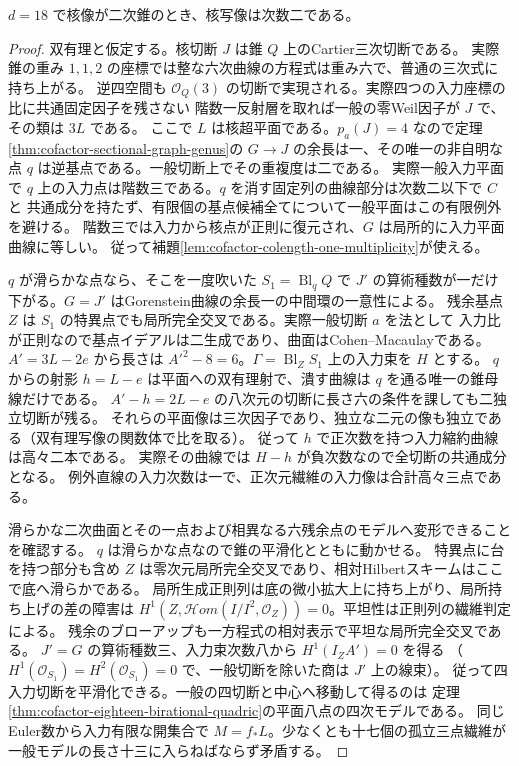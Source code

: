 \begin{theorem}\label{thm:cofactor-eighteen-cone-not-birational}
$d=18$ で核像が二次錐のとき、核写像は次数二である。
\end{theorem}
\begin{proof}
双有理と仮定する。核切断 $J$ は錐 $Q$ 上のCartier三次切断である。
実際錐の重み $1,1,2$ の座標では整な六次曲線の方程式は重み六で、普通の三次式に持ち上がる。
逆四空間も $\mathcal O_Q(3)$ の切断で実現される。実際四つの入力座標の比に共通固定因子を残さない
階数一反射層を取れば一般の零Weil因子が $J$ で、その類は $3L$ である。
ここで $L$ は核超平面である。$p_a(J)=4$ なので定理\ref{thm:cofactor-sectional-graph-genus}の
$G\to J$ の余長は一、その唯一の非自明な点 $q$ は逆基点である。一般切断上でその重複度は二である。
実際一般入力平面で $q$ 上の入力点は階数三である。$q$ を消す固定列の曲線部分は次数二以下で $C$ と
共通成分を持たず、有限個の基点候補全てについて一般平面はこの有限例外を避ける。
階数三では入力から核点が正則に復元され、$G$ は局所的に入力平面曲線に等しい。
従って補題\ref{lem:cofactor-colength-one-multiplicity}が使える。

$q$ が滑らかな点なら、そこを一度吹いた $S_1=\operatorname{Bl}_q Q$ で
$J'$ の算術種数が一だけ下がる。$G=J'$ はGorenstein曲線の余長一の中間環の一意性による。
残余基点 $Z$ は $S_1$ の特異点でも局所完全交叉である。実際一般切断 $a$ を法として
入力比が正則なので基点イデアルは二生成であり、曲面はCohen--Macaulayである。
$A'=3L-2e$ から長さは $A'^2-8=6$。$\Gamma=\operatorname{Bl}_Z S_1$ 上の入力束を $H$ とする。
$q$ からの射影 $h=L-e$ は平面への双有理射で、潰す曲線は $q$ を通る唯一の錐母線だけである。
$A'-h=2L-e$ の八次元の切断に長さ六の条件を課しても二独立切断が残る。
それらの平面像は三次因子であり、独立な二元の像も独立である（双有理写像の関数体で比を取る）。
従って $h$ で正次数を持つ入力縮約曲線は高々二本である。
実際その曲線では $H-h$ が負次数なので全切断の共通成分となる。
例外直線の入力次数は一で、正次元繊維の入力像は合計高々三点である。

滑らかな二次曲面とその一点および相異なる六残余点のモデルへ変形できることを確認する。
$q$ は滑らかな点なので錐の平滑化とともに動かせる。
特異点に台を持つ部分も含め $Z$ は零次元局所完全交叉であり、相対Hilbertスキームはここで底へ滑らかである。
局所生成正則列は底の微小拡大上に持ち上がり、局所持ち上げの差の障害は
$H^1(Z,\mathcal Hom(I/I^2,\mathcal O_Z))=0$。平坦性は正則列の繊維判定による。
残余のブローアップも一方程式の相対表示で平坦な局所完全交叉である。
$J'=G$ の算術種数三、入力束次数八から $H^1(I_Z A')=0$ を得る
（$H^1(\mathcal O_{S_1})=H^2(\mathcal O_{S_1})=0$ で、一般切断を除いた商は $J'$ 上の線束）。
従って四入力切断を平滑化できる。一般の四切断と中心へ移動して得るのは
定理\ref{thm:cofactor-eighteen-birational-quadric}の平面八点の四次モデルである。
同じEuler数から入力有限な開集合で $M=f_*L$。少なくとも十七個の孤立三点繊維が
一般モデルの長さ十三に入らねばならず矛盾する。


\end{proof}
